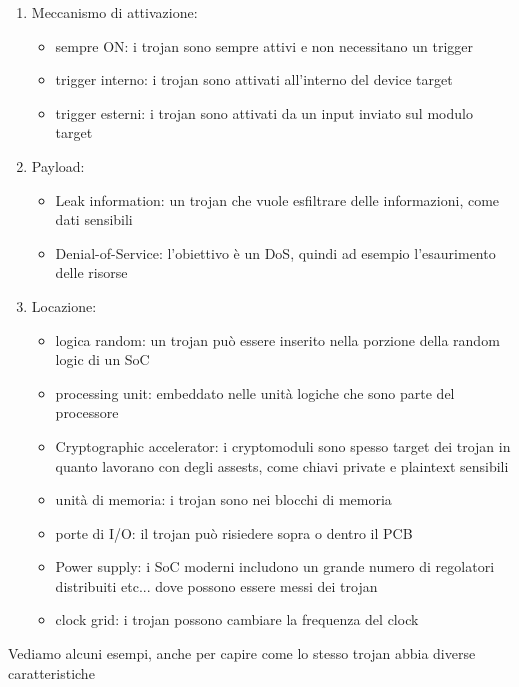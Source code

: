 \documentclass[oneside, 12pt]{extbook}
\begin{document}
\begin{enumerate}
	\item Meccanismo di attivazione:
	\begin{itemize}
		\item sempre ON: i trojan sono sempre attivi e non necessitano un trigger
		\item trigger interno: i trojan sono attivati all'interno del device target
		\item trigger esterni: i trojan sono attivati da un input inviato sul modulo target
	\end{itemize}
	\item Payload:
	\begin{itemize}
		\item Leak information: un trojan che vuole esfiltrare delle informazioni, come dati sensibili
		\item Denial-of-Service: l'obiettivo è un DoS, quindi ad esempio l'esaurimento delle risorse
	\end{itemize}
	\item Locazione:
	\begin{itemize}
		\item logica random: un trojan può essere inserito nella porzione della random logic di un SoC
		\item processing unit: embeddato nelle unità logiche che sono parte del processore
		\item Cryptographic accelerator: i cryptomoduli sono spesso target dei trojan in quanto lavorano con degli assests, come chiavi private e plaintext sensibili
		\item unità di memoria: i trojan sono nei blocchi di memoria
		\item porte di I/O: il trojan può risiedere sopra o dentro il PCB
		\item Power supply: i SoC moderni includono un grande numero di regolatori distribuiti etc... dove possono essere messi dei trojan
		\item clock grid: i trojan possono cambiare la frequenza del clock
	\end{itemize}
\end{enumerate}
Vediamo alcuni esempi, anche per capire come lo stesso trojan abbia diverse caratteristiche
\end{document}
